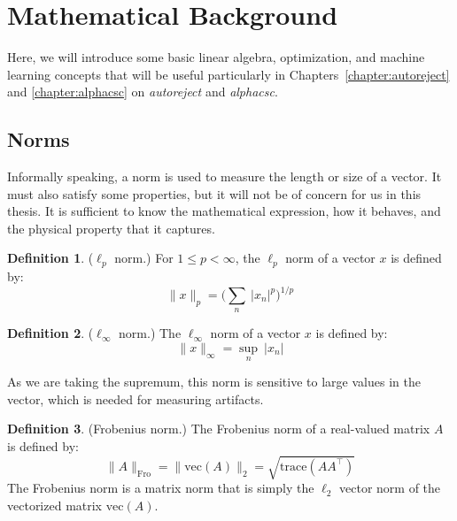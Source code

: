 
\section{Mathematical Background}

Here, we will introduce some basic linear algebra, optimization, and machine learning concepts that will be useful particularly in Chapters~\ref{chapter:autoreject} and \ref{chapter:alphacsc} on \emph{autoreject} and \emph{alphacsc}.

\subsection{Norms}
Informally speaking, a norm is used to measure the length or size of a vector. It must also satisfy some properties, but it will not be of concern for us in this thesis. It is sufficient to know the mathematical expression, how it behaves, and the physical property that it captures.
\theoremstyle{definition}
\newtheorem{definition}{Definition}[chapter]
%
%
\vspace{\parskip}
\begin{definition}{($\ell_p$ norm.)}
For $1 \leq p < \infty$, the $\ell_p$ norm of a vector $x$ is defined by:
\begin{equation}
\|x\|_p = \Big(\sum_n \ \lvert x_n \rvert^p \Big)^{1/p}
\end{equation}
\end{definition}
%
%
\vspace{\parskip}
\begin{definition}{($\ell_\infty$ norm.)}
The $\ell_\infty$ norm of a vector $x$ is defined by:
\begin{equation}
\|x\|_{\infty} = \sup_n \ \lvert x_n \rvert
\end{equation}
\label{def:norm}
\end{definition}
As we are taking the supremum, this norm is sensitive to large values in the vector, which is needed for measuring artifacts.
%
%
\vspace{\parskip}
\begin{definition}{(Frobenius norm.)}
The Frobenius norm of a real-valued matrix $A$ is defined by:
\begin{equation}
\|A\|_{\mathrm{Fro}} = \| \mathrm{vec}(A) \|_2 = \sqrt{\mathrm{trace}(AA^\top)}
\end{equation}
%
The Frobenius norm is a matrix norm that is simply the $\ell_2$ vector norm of the vectorized matrix $\mathrm{vec}(A)$.

\end{definition}

